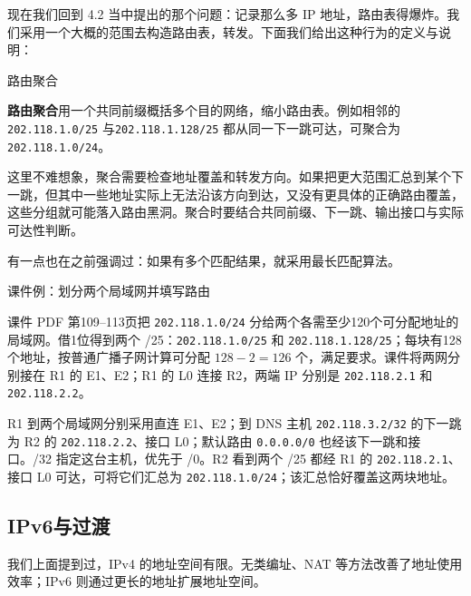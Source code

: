 现在我们回到 4.2 当中提出的那个问题：记录那么多 IP 地址，路由表得爆炸。我们采用一个大概的范围去构造路由表，转发。下面我们给出这种行为的定义与说明：

\begin{proposition}{路由聚合}
\begin{sloppypar}
\textbf{路由聚合}用一个共同前缀概括多个目的网络，缩小路由表。例如相邻的\allowbreak \texttt{202.118.1.0/25} 与\allowbreak \texttt{202.118.1.128/25} 都从同一下一跳可达，可聚合为 \texttt{202.118.1.0/24}。
\end{sloppypar}
\end{proposition}

\begin{remark}
这里不难想象，聚合需要检查地址覆盖和转发方向。如果把更大范围汇总到某个下一跳，但其中一些地址实际上无法沿该方向到达，又没有更具体的正确路由覆盖，这些分组就可能落入路由黑洞。聚合时要结合共同前缀、下一跳、输出接口与实际可达性判断。
\end{remark}
\begin{remark}
有一点也在之前强调过：如果有多个匹配结果，就采用最长匹配算法。
\end{remark}

\begin{example}{课件例：划分两个局域网并填写路由}
\begin{sloppypar}
课件 PDF 第109--113页把 \texttt{202.118.1.0/24} 分给两个各需至少120个可分配地址的局域网。借1位得到两个 /25：\texttt{202.118.1.0/25} 和 \texttt{202.118.1.128/25}；每块有128个地址，按普通广播子网计算可分配 $128-2=126$ 个，满足要求。课件将两网分别接在 R1 的 E1、E2；R1 的 L0 连接 R2，两端 IP 分别是 \texttt{202.118.2.1} 和 \texttt{202.118.2.2}。

R1 到两个局域网分别采用直连 E1、E2；到 DNS 主机 \texttt{202.118.3.2/32} 的下一跳为 R2 的 \texttt{202.118.2.2}、接口 L0；默认路由 \texttt{0.0.0.0/0} 也经该下一跳和接口。/32 指定这台主机，优先于 /0。R2 看到两个 /25 都经 R1 的 \texttt{202.118.2.1}、接口 L0 可达，可将它们汇总为 \texttt{202.118.1.0/24}；该汇总恰好覆盖这两块地址。
\end{sloppypar}
\end{example}

\subsection{IPv6与过渡}
我们上面提到过，IPv4 的地址空间有限。无类编址、NAT 等方法改善了地址使用效率；IPv6 则通过更长的地址扩展地址空间。


